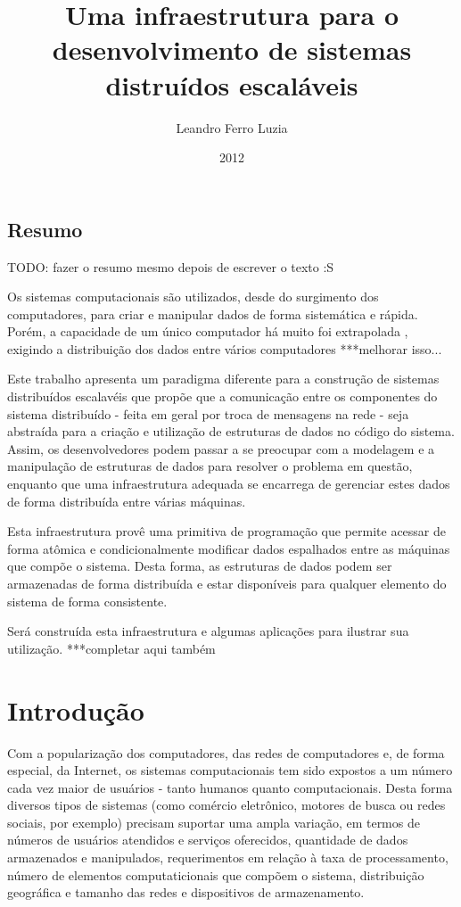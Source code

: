 \documentclass[a4paper,12pt]{report}
\title{Uma infraestrutura para o desenvolvimento de sistemas distruídos escaláveis}
\author{Leandro Ferro Luzia}
\date{2012}
\begin{document}
\pagestyle{headings}
\maketitle
\section*{Resumo}
TODO: fazer o resumo mesmo depois de escrever o texto :S

Os sistemas computacionais são utilizados, desde do surgimento dos computadores, para criar e manipular dados de forma sistemática e rápida. Porém, a capacidade de um único computador há muito foi extrapolada , exigindo a distribuição dos dados entre vários computadores ***melhorar isso...

Este trabalho apresenta um paradigma diferente para a construção de sistemas distribuídos escalavéis que propõe que a comunicação entre os componentes do sistema distribuído - feita em geral por troca de mensagens na rede - seja abstraída para a criação e utilização de estruturas de dados no código do sistema. Assim, os desenvolvedores podem passar a se preocupar com a modelagem e a manipulação de estruturas de dados para resolver o problema em questão, enquanto que uma infraestrutura adequada se encarrega de gerenciar estes dados de forma distribuída entre várias máquinas.

Esta infraestrutura provê uma primitiva de programação que permite acessar de forma atômica e condicionalmente modificar dados espalhados entre as máquinas que compõe o sistema. Desta forma, as estruturas de dados podem ser armazenadas de forma distribuída e estar disponíveis para qualquer elemento do sistema de forma consistente.

Será construída esta infraestrutura e algumas aplicações para ilustrar sua utilização. ***completar aqui também
\tableofcontents
\listoftables
\listoffigures

\chapter{Introdução}
Com a popularização dos computadores, das redes de computadores e, de forma especial, da Internet, os sistemas computacionais tem sido expostos a um número cada vez maior de usuários - tanto humanos quanto computacionais. Desta forma diversos tipos de sistemas (como comércio eletrônico, motores de busca ou redes sociais, por exemplo) precisam suportar uma ampla variação, em termos de números de usuários atendidos e serviços oferecidos, quantidade de dados armazenados e manipulados, requerimentos em relação à taxa de processamento, número de elementos computaticionais que compõem o sistema, distribuição geográfica e tamanho das redes e dispositivos de armazenamento. 
\end{document}
